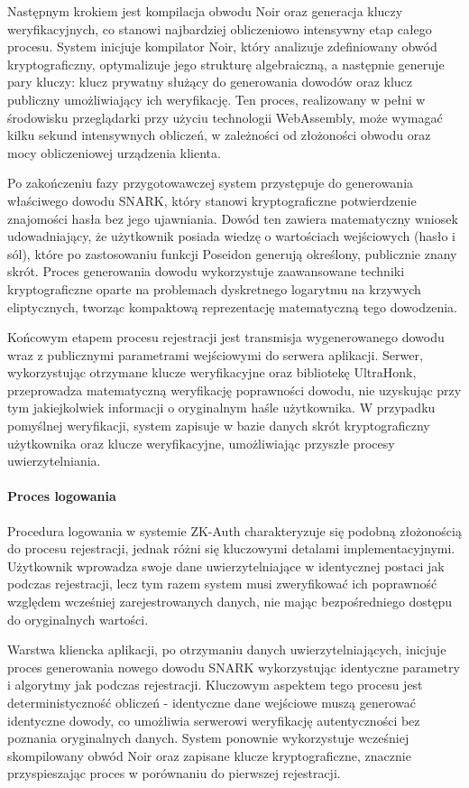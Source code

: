 \documentclass{article}
\begin{document}
Następnym krokiem jest kompilacja obwodu Noir oraz generacja kluczy weryfikacyjnych, co stanowi najbardziej obliczeniowo intensywny etap całego procesu. System inicjuje kompilator Noir, który analizuje zdefiniowany obwód kryptograficzny, optymalizuje jego strukturę algebraiczną, a następnie generuje pary kluczy: klucz prywatny służący do generowania dowodów oraz klucz publiczny umożliwiający ich weryfikację. Ten proces, realizowany w pełni w środowisku przeglądarki przy użyciu technologii WebAssembly, może wymagać kilku sekund intensywnych obliczeń, w zależności od złożoności obwodu oraz mocy obliczeniowej urządzenia klienta.

Po zakończeniu fazy przygotowawczej system przystępuje do generowania właściwego dowodu SNARK, który stanowi kryptograficzne potwierdzenie znajomości hasła bez jego ujawniania. Dowód ten zawiera matematyczny wniosek udowadniający, że użytkownik posiada wiedzę o wartościach wejściowych (hasło i sól), które po zastosowaniu funkcji Poseidon generują określony, publicznie znany skrót. Proces generowania dowodu wykorzystuje zaawansowane techniki kryptograficzne oparte na problemach dyskretnego logarytmu na krzywych eliptycznych, tworząc kompaktową reprezentację matematyczną tego dowodzenia.

Końcowym etapem procesu rejestracji jest transmisja wygenerowanego dowodu wraz z publicznymi parametrami wejściowymi do serwera aplikacji. Serwer, wykorzystując otrzymane klucze weryfikacyjne oraz bibliotekę UltraHonk, przeprowadza matematyczną weryfikację poprawności dowodu, nie uzyskując przy tym jakiejkolwiek informacji o oryginalnym haśle użytkownika. W przypadku pomyślnej weryfikacji, system zapisuje w bazie danych skrót kryptograficzny użytkownika oraz klucze weryfikacyjne, umożliwiając przyszłe procesy uwierzytelniania.

\paragraph{Proces logowania}
Procedura logowania w systemie ZK-Auth charakteryzuje się podobną złożonością do procesu rejestracji, jednak różni się kluczowymi detalami implementacyjnymi. Użytkownik wprowadza swoje dane uwierzytelniające w identycznej postaci jak podczas rejestracji, lecz tym razem system musi zweryfikować ich poprawność względem wcześniej zarejestrowanych danych, nie mając bezpośredniego dostępu do oryginalnych wartości.

Warstwa kliencka aplikacji, po otrzymaniu danych uwierzytelniających, inicjuje proces generowania nowego dowodu SNARK wykorzystując identyczne parametry i algorytmy jak podczas rejestracji. Kluczowym aspektem tego procesu jest deterministyczność obliczeń - identyczne dane wejściowe muszą generować identyczne dowody, co umożliwia serwerowi weryfikację autentyczności bez poznania oryginalnych danych. System ponownie wykorzystuje wcześniej skompilowany obwód Noir oraz zapisane klucze kryptograficzne, znacznie przyspieszając proces w porównaniu do pierwszej rejestracji.
\end{document}
